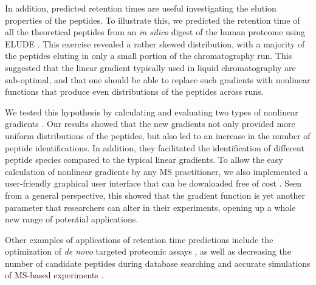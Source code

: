 \documentclass[a4paper]{article}
\begin{document}
In addition, predicted retention times are useful investigating
the elution properties of the peptides.  To illustrate this, we predicted the retention time of all the
theoretical peptides from an {\it in silico} digest of the human
proteome using  {\sc ELUDE}  \cite{elude1}. This exercise revealed a rather skewed
distribution, with a majority of the peptides eluting in only a small
portion of the chromatography run. This suggested that
the linear gradient typically used in liquid chromatography are sub-optimal, and that one should be able to replace such gradients with nonlinear functions that produce even
distributions of the peptides across runs.




We tested this hypothesis by calculating and evaluating two types of
nonlinear gradients \cite{gradopt1}. Our results showed that the new
gradients not only provided more uniform distributions of the
peptides, but also led to an increase in the number of peptide
identifications. In addition, they facilitated the identification of
different peptide species compared to the typical linear gradients. To
allow the easy calculation of nonlinear gradients by any MS
practitioner, we also implemented a user-friendly graphical user
interface that can be downloaded free of cost \cite{gradopt2}.  Seen
from a general perspective, this showed that the gradient function is
yet another parameter that researchers can alter in their experiments,
opening up a whole new range of potential applications.




Other examples of applications of retention time predictions include the optimization of  {\em de novo} targeted proteomic
assays \cite{bertsch2010}, as well as decreasing the
number of candidate peptides during database
searching \cite{lobas2013} and accurate simulations of MS-based
experiments \cite{bielow2011}.



 
\end{document}
